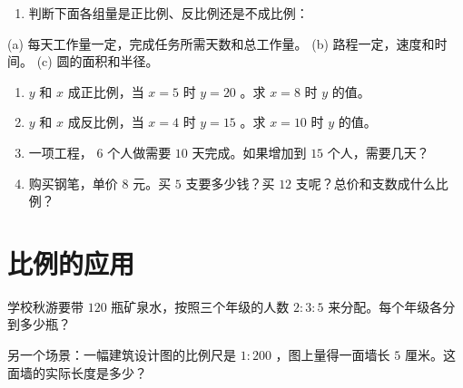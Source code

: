 \begin{practice}


\begin{enumerate}
  \item 判断下面各组量是正比例、反比例还是不成比例：
\end{enumerate}

   (a) 每天工作量一定，完成任务所需天数和总工作量。
   (b) 路程一定，速度和时间。
   (c) 圆的面积和半径。
\begin{enumerate}
  \item $y$ 和 $x$ 成正比例，当 $x = 5$ 时 $y = 20$ 。求 $x = 8$ 时 $y$ 的值。
  \item $y$ 和 $x$ 成反比例，当 $x = 4$ 时 $y = 15$ 。求 $x = 10$ 时 $y$ 的值。
  \item 一项工程， $6$ 个人做需要 $10$ 天完成。如果增加到 $15$ 个人，需要几天？
  \item 购买钢笔，单价 $8$ 元。买 $5$ 支要多少钱？买 $12$ 支呢？总价和支数成什么比例？
\end{enumerate}


\end{practice}

\section*{比例的应用}


\begin{explore}


学校秋游要带 $120$ 瓶矿泉水，按照三个年级的人数 $2 : 3 : 5$ 来分配。每个年级各分到多少瓶？

另一个场景：一幅建筑设计图的比例尺是 $1 : 200$ ，图上量得一面墙长 $5$ 厘米。这面墙的实际长度是多少？

\end{explore}

